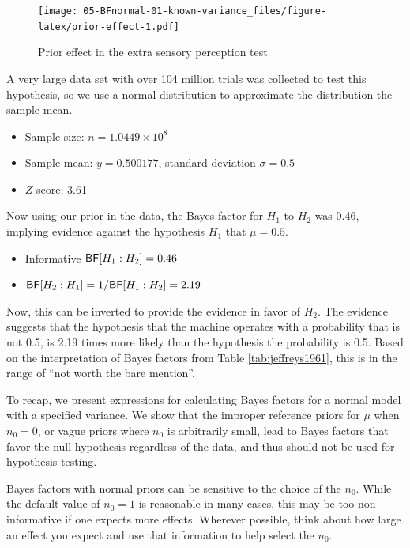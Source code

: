 \documentclass[]{book}
\providecommand{\tightlist}{%
  \setlength{\itemsep}{0pt}\setlength{\parskip}{0pt}}
\theoremstyle{definition}
\theoremstyle{definition}
\theoremstyle{definition}
\theoremstyle{remark}
\begin{document}
\begin{figure}[htbp]
\centering
\texttt{[image: 05-BFnormal-01-known-variance\_files/figure-latex/prior-effect-1.pdf]}
\caption{\label{fig:prior-effect}Prior effect in the extra sensory
perception test}
\end{figure}

A very large data set with over 104 million trials was collected to test
this hypothesis, so we use a normal distribution to approximate the
distribution the sample mean.

\begin{itemize}
\tightlist
\item
  Sample size: \(n = 1.0449 \times 10^8\)
\item
  Sample mean: \(\bar{y} = 0.500177\), standard deviation
  \(\sigma = 0.5\)
\item
  \(Z\)-score: 3.61
\end{itemize}

Now using our prior in the data, the Bayes factor for \(H_1\) to \(H_2\)
was 0.46, implying evidence against the hypothesis \(H_1\) that
\(\mu = 0.5\).

\begin{itemize}
\tightlist
\item
  Informative \(\textsf{BF}[H_1:H_2] = 0.46\)
\item
  \(\textsf{BF}[H_2:H_1] = 1/\textsf{BF}[H_1:H_2] = 2.19\)
\end{itemize}

Now, this can be inverted to provide the evidence in favor of \(H_2\).
The evidence suggests that the hypothesis that the machine operates with
a probability that is not 0.5, is 2.19 times more likely than the
hypothesis the probability is 0.5. Based on the interpretation of Bayes
factors from Table \ref{tab:jeffreys1961}, this is in the range of ``not
worth the bare mention''.

To recap, we present expressions for calculating Bayes factors for a
normal model with a specified variance. We show that the improper
reference priors for \(\mu\) when \(n_0 = 0\), or vague priors where
\(n_0\) is arbitrarily small, lead to Bayes factors that favor the null
hypothesis regardless of the data, and thus should not be used for
hypothesis testing.

Bayes factors with normal priors can be sensitive to the choice of the
\(n_0\). While the default value of \(n_0 = 1\) is reasonable in many
cases, this may be too non-informative if one expects more effects.
Wherever possible, think about how large an effect you expect and use
that information to help select the \(n_0\).
\end{document}
